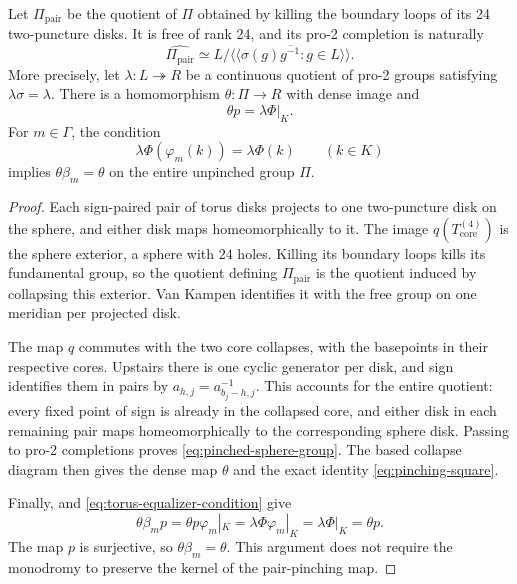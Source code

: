 \begin{lemma}\label{lem:pinched-sphere}
Let $\Pi_{\mathrm{pair}}$ be the quotient of $\Pi$ obtained by
killing the boundary loops of its 24 two-puncture disks.
It is free of rank 24, and its pro-2 completion is naturally
\begin{equation}\label{eq:pinched-sphere-group}
 \widehat{\Pi_{\mathrm{pair}}}
 \simeq L/\overline{\langle\!\langle
              \sigma(g)g^{-1}:g\in L
                    \rangle\!\rangle}.
\end{equation}
More precisely, let $\lambda:L\twoheadrightarrow R$ be a continuous
quotient of pro-2 groups satisfying $\lambda\sigma=\lambda$.
There is a homomorphism $\theta:\Pi\to R$ with dense image and
\begin{equation}\label{eq:pinching-square}
 \theta p=\lambda\Phi|_K.
\end{equation}
For $m\in\Gamma$, the condition
\begin{equation}\label{eq:torus-equalizer-condition}
 \lambda\Phi(\varphi_m(k))=\lambda\Phi(k)
 \qquad(k\in K)
\end{equation}
implies $\theta\beta_m=\theta$ on the entire unpinched group
$\Pi$.
\end{lemma}

\begin{proof}
Each sign-paired pair of torus disks projects to one two-puncture
disk on the sphere, and either disk maps homeomorphically to it.
The image $q(T_{\mathrm{core}}^{(4)})$ is the sphere exterior, a sphere with $24$
holes. Killing its boundary loops kills its fundamental group,
so the quotient defining $\Pi_{\mathrm{pair}}$ is the quotient
induced by collapsing this exterior. Van Kampen identifies it
with the free group on one meridian per projected disk.

The map $q$ commutes with the two core collapses, with the
basepoints in their respective cores. Upstairs there is one
cyclic generator per disk, and sign identifies them in pairs by
$a_{h,j}=a_{b_j-h,j}^{-1}$. This accounts for the entire quotient:
every fixed point of sign is already in the collapsed core, and
either disk in each remaining pair maps homeomorphically to the
corresponding sphere disk. Passing to pro-2 completions proves
\eqref{eq:pinched-sphere-group}. The based collapse diagram then
gives the dense map $\theta$ and the exact identity
\eqref{eq:pinching-square}.

Finally,  and
\eqref{eq:torus-equalizer-condition} give
\[
 \theta\beta_m p
 =\theta p\varphi_m|_K
 =\lambda\Phi\varphi_m|_K
 =\lambda\Phi|_K
 =\theta p.
\]
The map $p$ is surjective, so $\theta\beta_m=\theta$.
This argument does not require the monodromy to preserve the
kernel of the pair-pinching map.
\end{proof}

